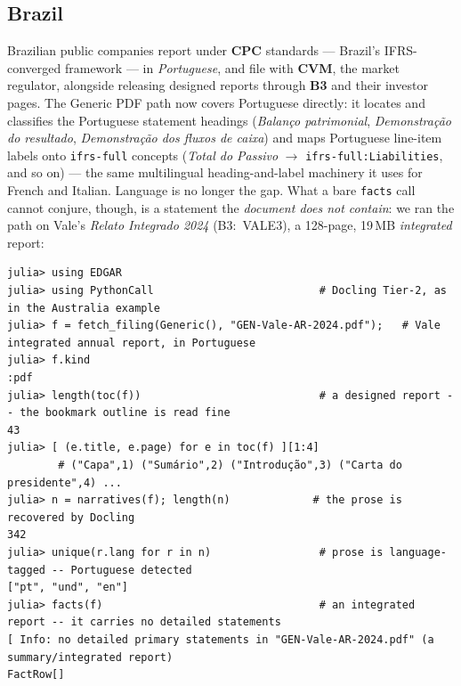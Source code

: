 \documentclass[11pt,a4paper]{report}
\begin{document}
\subsection{Brazil}
\label{sec:generic-brazil}

Brazilian public companies report under \textbf{CPC} standards --- Brazil's IFRS-converged framework --- in
\emph{Portuguese}, and file with \textbf{CVM}, the market regulator, alongside releasing designed reports
through \textbf{B3} and their investor pages. The Generic PDF path now covers Portuguese directly: it locates
and classifies the Portuguese statement headings (\emph{Balanço patrimonial}, \emph{Demonstração do resultado},
\emph{Demonstração dos fluxos de caixa}) and maps Portuguese line-item labels onto \texttt{ifrs-full} concepts
(\emph{Total do Passivo} $\to$ \texttt{ifrs-full:Liabilities}, and so on) --- the same multilingual
heading-and-label machinery it uses for French and Italian. Language is no longer the gap. What a bare
\texttt{facts} call cannot conjure, though, is a statement the \emph{document does not contain}: we ran the path
on Vale's \emph{Relato Integrado 2024} (B3:~VALE3), a 128-page, 19\,MB \emph{integrated} report:

\begin{lstlisting}
julia> using EDGAR
julia> using PythonCall                          # Docling Tier-2, as in the Australia example
julia> f = fetch_filing(Generic(), "GEN-Vale-AR-2024.pdf");   # Vale integrated annual report, in Portuguese
julia> f.kind
:pdf
julia> length(toc(f))                            # a designed report -- the bookmark outline is read fine
43
julia> [ (e.title, e.page) for e in toc(f) ][1:4]
        # ("Capa",1) ("Sumário",2) ("Introdução",3) ("Carta do presidente",4) ...
julia> n = narratives(f); length(n)             # the prose is recovered by Docling
342
julia> unique(r.lang for r in n)                 # prose is language-tagged -- Portuguese detected
["pt", "und", "en"]
julia> facts(f)                                  # an integrated report -- it carries no detailed statements
[ Info: no detailed primary statements in "GEN-Vale-AR-2024.pdf" (a summary/integrated report)
FactRow[]
\end{lstlisting}
\end{document}
